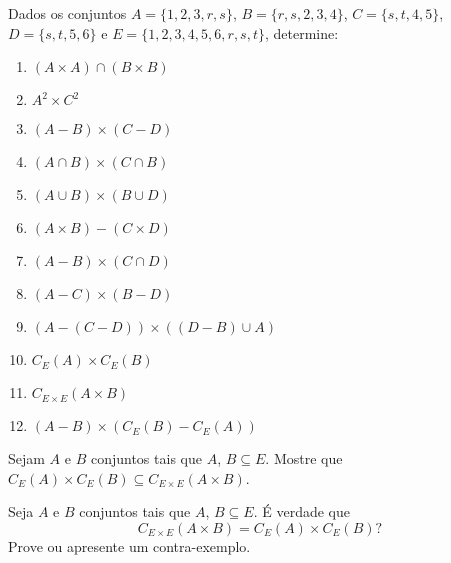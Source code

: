 \documentclass[12pt]{exam}
\begin{document}
    \vspace{.3cm}

    \questao{} Dados os conjuntos $A = \{1, 2, 3, r, s\}$, $B = \{r, s, 2, 3, 4\}$, $C = \{s, t, 4, 5\}$, $D = \{s, t, 5, 6\}$ e $E = \{1, 2, 3, 4, 5, 6, r, s, t\}$, determine:
    \begin{multicols}{2}
        \begin{enumerate}[label={\alph*})]
            \item $(A \times A) \cap (B \times B)$

            \item $A^2 \times C^2$

            \item $(A - B) \times (C - D)$

            \item $(A \cap B) \times (C \cap B)$

            \item $(A \cup B) \times (B \cup D)$

            \item $(A \times B) - (C \times D)$

            \item $(A - B) \times (C \cap D)$

            \item $(A - C) \times (B - D)$

            \item $(A - (C - D)) \times ((D - B) \cup A)$

            \item $C_E(A) \times C_E(B)$

            \item $C_{E\times E}(A \times B)$

            \item $(A - B) \times (C_E(B) - C_E(A))$
        \end{enumerate}

    \end{multicols}

    \vspace{.3cm}

    \questao{} Sejam $A$ e $B$ conjuntos tais que $A$, $B \subseteq E$. Mostre que $C_E(A) \times C_E(B) \subseteq C_{E \times E}(A \times B)$.

    \vspace{.3cm}

    \questao{} Seja $A$ e $B$ conjuntos tais que $A$, $B \subseteq E$. É verdade que
    \[
        C_{E\times E}(A \times B) = C_E(A) \times C_E(B)?
    \]
    Prove ou apresente um contra-exemplo.
\end{document}

